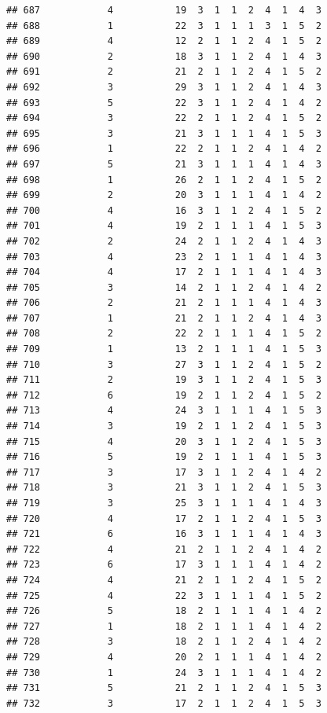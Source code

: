 \documentclass[12pt,]{krantz}
\theoremstyle{definition}
\theoremstyle{definition}
\theoremstyle{remark}
\begin{document}
\begin{verbatim}
## 687            4           19  3  1  1  2  4  1  4  3
## 688            1           22  3  1  1  1  3  1  5  2
## 689            4           12  2  1  1  2  4  1  5  2
## 690            2           18  3  1  1  2  4  1  4  3
## 691            2           21  2  1  1  2  4  1  5  2
## 692            3           29  3  1  1  2  4  1  4  3
## 693            5           22  3  1  1  2  4  1  4  2
## 694            3           22  2  1  1  2  4  1  5  2
## 695            3           21  3  1  1  1  4  1  5  3
## 696            1           22  2  1  1  2  4  1  4  2
## 697            5           21  3  1  1  1  4  1  4  3
## 698            1           26  2  1  1  2  4  1  5  2
## 699            2           20  3  1  1  1  4  1  4  2
## 700            4           16  3  1  1  2  4  1  5  2
## 701            4           19  2  1  1  1  4  1  5  3
## 702            2           24  2  1  1  2  4  1  4  3
## 703            4           23  2  1  1  1  4  1  4  3
## 704            4           17  2  1  1  1  4  1  4  3
## 705            3           14  2  1  1  2  4  1  4  2
## 706            2           21  2  1  1  1  4  1  4  3
## 707            1           21  2  1  1  2  4  1  4  3
## 708            2           22  2  1  1  1  4  1  5  2
## 709            1           13  2  1  1  1  4  1  5  3
## 710            3           27  3  1  1  2  4  1  5  2
## 711            2           19  3  1  1  2  4  1  5  3
## 712            6           19  2  1  1  2  4  1  5  2
## 713            4           24  3  1  1  1  4  1  5  3
## 714            3           19  2  1  1  2  4  1  5  3
## 715            4           20  3  1  1  2  4  1  5  3
## 716            5           19  2  1  1  1  4  1  5  3
## 717            3           17  3  1  1  2  4  1  4  2
## 718            3           21  3  1  1  2  4  1  5  3
## 719            3           25  3  1  1  1  4  1  4  3
## 720            4           17  2  1  1  2  4  1  5  3
## 721            6           16  3  1  1  1  4  1  4  3
## 722            4           21  2  1  1  2  4  1  4  2
## 723            6           17  3  1  1  1  4  1  4  2
## 724            4           21  2  1  1  2  4  1  5  2
## 725            4           22  3  1  1  1  4  1  5  2
## 726            5           18  2  1  1  1  4  1  4  2
## 727            1           18  2  1  1  1  4  1  4  2
## 728            3           18  2  1  1  2  4  1  4  2
## 729            4           20  2  1  1  1  4  1  4  2
## 730            1           24  3  1  1  1  4  1  4  2
## 731            5           21  2  1  1  2  4  1  5  3
## 732            3           17  2  1  1  2  4  1  5  3

\end{verbatim}
\end{document}
